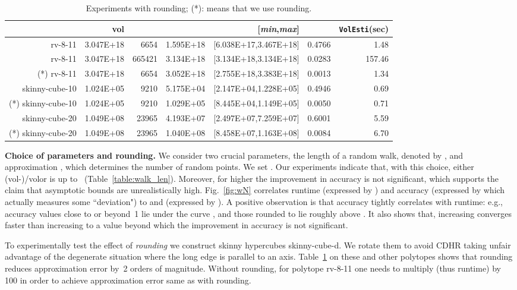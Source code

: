 \documentclass[11pt,a4paper]{article}
\def\vol{\mbox{vol}}
\def\vol{\mbox{vol}}
\def\Min{{\it min}}
\def\Max{{\it max}}
\begin{document}
\begin{table}[t]\centering\scriptsize
\begin{tabular*}{\linewidth}{@{\extracolsep{\fill}}rrrrrrr}
 & \vol &  &  & [\Min,\Max] &  & {\tt VolEsti}(sec) 
\\\hline
rv-8-11 & 3.047E+18 & 6654 & 1.595E+18 & [6.038E+17,3.467E+18] & 0.4766 & 1.48\\
rv-8-11 & 3.047E+18 & 665421 & 3.134E+18 & [3.134E+18,3.134E+18] & 0.0283 & 157.46\\
(*) rv-8-11 & 3.047E+18 & 6654 & 3.052E+18 & [2.755E+18,3.383E+18] & 0.0013 & 1.34\\
skinny-cube-10 & 1.024E+05 & 9210 & 5.175E+04 & [2.147E+04,1.228E+05] & 0.4946 & 0.69\\
(*) skinny-cube-10 & 1.024E+05 & 9210 & 1.029E+05 & [8.445E+04,1.149E+05] & 0.0050 & 0.71\\
skinny-cube-20 & 1.049E+08 & 23965 & 4.193E+07 & [2.497E+07,7.259E+07] & 0.6001 & 5.59\\
(*) skinny-cube-20 & 1.049E+08 & 23965 & 1.040E+08 & [8.458E+07,1.163E+08] & 0.0084 & 6.70\\
\end{tabular*} 
\caption{ Experiments with rounding; (*): means that we use rounding.
\label{table:rounding}}
\end{table} 

\textbf{Choice of parameters and rounding.}
We consider two crucial parameters,  
the length of a random walk, denoted by , and approximation
, which determines the number  of random points. 
We set .
Our experiments indicate that, with this choice, either
(\vol-)/\vol or  is 
up to ~(Table~\ref{table:walk_len}). 
Moreover, for higher  the improvement in accuracy is not significant,
which supports the claim that asymptotic bounds are unrealistically high.
Fig.~\ref{fig:wN} correlates runtime (expressed by ) and
accuracy (expressed by  which actually measures 
some ``deviation") to  and  (expressed by ).
A positive observation is that accuracy tightly correlates with runtime:
e.g., accuracy values close to or beyond~1 lie under the curve ,
and those rounded to  lie roughly above .
It also shows that,
increasing  converges faster than increasing  to a value beyond which the improvement in accuracy is not significant.

To experimentally test the effect of {\it rounding} we construct skinny
hypercubes skinny-cube-d.  
We rotate them to avoid CDHR taking unfair advantage of the degenerate
situation where the long edge is parallel to an axis. 
Table~\ref{table:rounding} on these and other polytopes shows that
rounding reduces approximation error by~2 orders of magnitude.
Without rounding, for polytope rv-8-11
one needs to multiply  (thus runtime) by 100 in order to achieve 
approximation error same as with rounding.  
\end{document}
